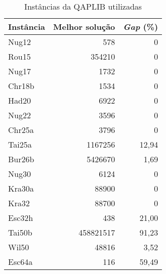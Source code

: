 \begin{table}[H]
  \caption{Instâncias da QAPLIB utilizadas\label{qapinst}}
  \centering
  \begin{tabular}{l r r}
    \toprule
    Instância & Melhor solução & \textit{Gap} (\%) \\
    \midrule
    Nug12 & 578 & 0 \\
    Rou15 & 354210 & 0 \\
    Nug17 & 1732 & 0 \\
    Chr18b & 1534 & 0 \\
    Had20 & 6922 & 0 \\
    Nug22 & 3596 & 0 \\
    Chr25a & 3796 & 0 \\
    Tai25a & 1167256 & 12,94 \\
    Bur26b & 5426670 & 1,69 \\
    Nug30 & 6124 & 0 \\
    Kra30a & 88900 & 0 \\
    Kra32  & 88700 & 0 \\
    Esc32h & 438 & 21,00 \\
    Tai50b & 458821517 & 91,23 \\
    Wil50 & 48816 & 3,52 \\
    Esc64a & 116 & 59,49 \\
    \bottomrule
  \end{tabular}
\end{table}
